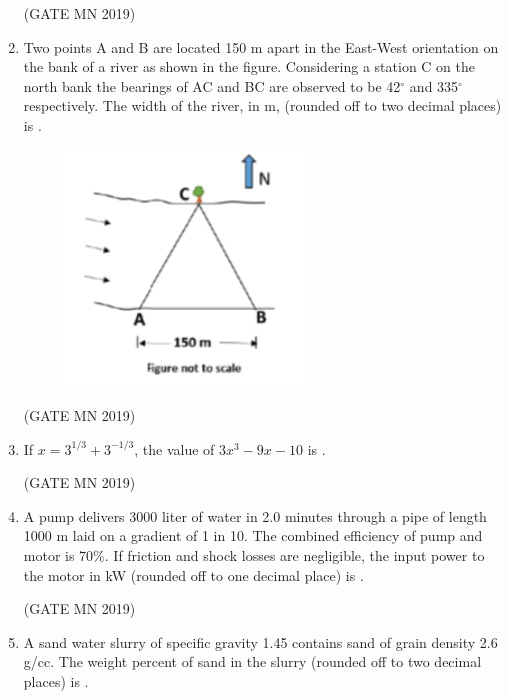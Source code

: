 \documentclass[journal]{IEEEtran}
\begin{document}
\begin{enumerate}
    \hfill(GATE MN 2019)

\item Two points A and B are located 150 m apart in the East-West orientation on the bank of a river as shown in the figure. Considering a station C on the north bank the bearings of AC and BC are observed to be 42$^{\circ}$ and 335$^{\circ}$ respectively. The width of the river, in m, (rounded off to two decimal places) is \underline{\hspace{2cm}}.  
\begin{figure}[H]
    \centering
        \includegraphics[width=0.6\textwidth]{Screenshot_2025_0818_152607.png}
	    \caption{}
    \label{fig:Q54}
    \end{figure}



    \hfill(GATE MN 2019)
\item If $x = 3^{1/3} + 3^{-1/3}$, the value of $3x^{3} - 9x - 10$ is \underline{\hspace{2cm}}.  


	\hfill(GATE MN 2019)

\item A pump delivers 3000 liter of water in 2.0 minutes through a pipe of length 1000 m laid on a gradient of 1 in 10. The combined efficiency of pump and motor is 70\%. If friction and shock losses are negligible, the input power to the motor in kW (rounded off to one decimal place) is \underline{\hspace{3cm}}.


	\hfill(GATE MN 2019)

\item A sand water slurry of specific gravity 1.45 contains sand of grain density 2.6 g/cc. The weight percent of sand in the slurry (rounded off to two decimal places) is \underline{\hspace{3cm}}.



\end{enumerate}
\end{document}

